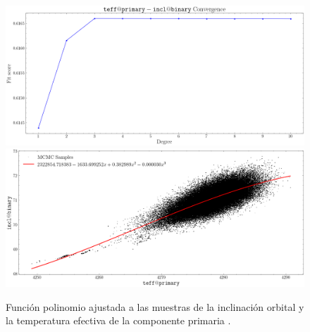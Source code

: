 \begin{figure}[!ht]
    \centering
    \includegraphics[scale=0.44]{Apendice/Figures/Figura incl-teff@primary Correlacion Convergencia.png}
    \includegraphics[scale=0.44]{Apendice/Figures/Figura incl-teff@primary Correlacion.png}
    \caption{Función polinomio ajustada a las muestras de la inclinación orbital
     y la temperatura efectiva de la componente primaria
    .}
\end{figure}

